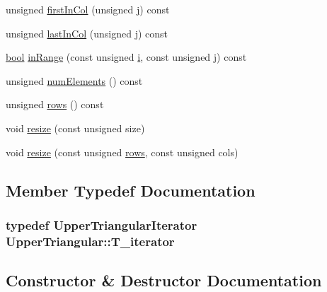 \begin{DoxyCompactItemize}
\item 
unsigned \hyperlink{classUpperTriangular_a0ea73c20a888758206c2e1b92064c737}{first\+In\+Col} (unsigned \hyperlink{indexexpr_8h_aa1f3325d66516548e69238097857fa98}{j}) const 
\item 
unsigned \hyperlink{classUpperTriangular_ab19d481683f2f9e893dcafd9de0f8efc}{last\+In\+Col} (unsigned \hyperlink{indexexpr_8h_aa1f3325d66516548e69238097857fa98}{j}) const 
\item 
\hyperlink{compiler_8h_abb452686968e48b67397da5f97445f5b}{bool} \hyperlink{classUpperTriangular_a26b4a2cc78e56f7ffc127a32c9eb288e}{in\+Range} (const unsigned \hyperlink{indexexpr_8h_aabd77643995707c185e95c8cb2782c81}{i}, const unsigned \hyperlink{indexexpr_8h_aa1f3325d66516548e69238097857fa98}{j}) const 
\item 
unsigned \hyperlink{classUpperTriangular_a3a0608a2ca518cafca5e759930fe0714}{num\+Elements} () const 
\item 
unsigned \hyperlink{classUpperTriangular_aeb2fa8962cd3af4d5101279fa29e6cdf}{rows} () const 
\item 
void \hyperlink{classUpperTriangular_a339a5fd5607a61694b8bac365baf514d}{resize} (const unsigned size)
\item 
void \hyperlink{classUpperTriangular_a116ee5c72454748c51fc617628cbc144}{resize} (const unsigned \hyperlink{classUpperTriangular_aeb2fa8962cd3af4d5101279fa29e6cdf}{rows}, const unsigned cols)
\end{DoxyCompactItemize}


\subsection{Member Typedef Documentation}
\hypertarget{classUpperTriangular_ab82c2e760411603c189ea24b5d67b499}{}
\subsubsection[{T\+\_\+iterator}]{\setlength{\rightskip}{0pt plus 5cm}typedef {\bf Upper\+Triangular\+Iterator} {\bf Upper\+Triangular\+::\+T\+\_\+iterator}}\label{classUpperTriangular_ab82c2e760411603c189ea24b5d67b499}


\subsection{Constructor \& Destructor Documentation}
\hypertarget{classUpperTriangular_a903c3966499bbb5a3cc967c993eb5151}{}
